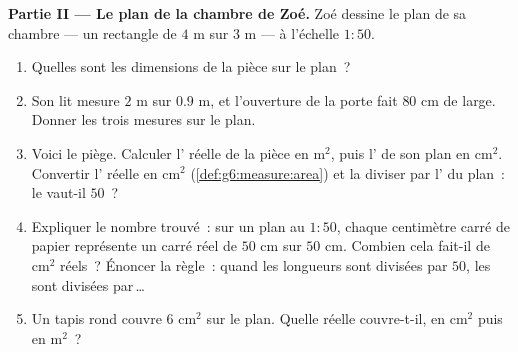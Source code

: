 \begin{problem}
\medskip
\noindent\textbf{Partie II --- Le plan de la chambre de Zoé.}
Zoé dessine le plan de sa chambre --- un rectangle de $4$ m sur
$3$ m --- à l'échelle $1:50$.
\begin{enumerate}[resume]
  \item Quelles sont les dimensions de la pièce sur le plan~?
  \item Son lit mesure $2$ m sur $0.9$ m, et l'ouverture de la porte
        fait $80$ cm de large. Donner les trois mesures sur le plan.
  \item Voici le piège. Calculer l' réelle de la pièce en
        m$^2$, puis l' de son plan en cm$^2$. Convertir l'
        réelle en cm$^2$ (\cref{def:g6:measure:area}) et la diviser
        par l' du plan~: le  vaut-il $50$~?
  \item Expliquer le nombre trouvé~: sur un plan au $1:50$, chaque
        centimètre carré de papier représente un carré réel de
        $50$ cm sur $50$ cm. Combien cela fait-il de cm$^2$ réels~?
        Énoncer la règle~: quand les longueurs sont divisées par
        $50$, les  sont divisées par\,\dots
  \item Un tapis rond couvre $6$ cm$^2$ sur le plan. Quelle 
        réelle couvre-t-il, en cm$^2$ puis en m$^2$~?
\end{enumerate}


\end{problem}
